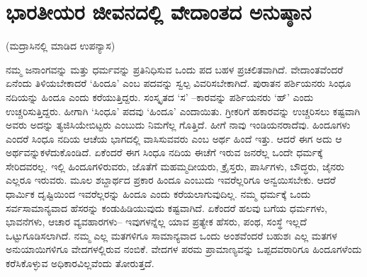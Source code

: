 
\chapter{ಭಾರತೀಯರ ಜೀವನದಲ್ಲಿ ವೇದಾಂತದ ಅನುಷ್ಠಾನ}

\begin{center}
(ಮದ್ರಾಸಿನಲ್ಲಿ ಮಾಡಿದ ಉಪನ್ಯಾಸ)
\end{center}

ನಮ್ಮ ಜನಾಂಗವನ್ನು ಮತ್ತು ಧರ್ಮವನ್ನು ಪ್ರತಿನಿಧಿಸುವ ಒಂದು ಪದ ಬಹಳ ಪ್ರಚಲಿತವಾಗಿದೆ. ವೇದಾಂತವೆಂದರೆ ಏನೆಂದು ತಿಳಿಯಬೇಕಾದರೆ ‘ಹಿಂದೂ’ ಎಂಬ ಪದವನ್ನು ಸ್ವಲ್ಪ ವಿವರಿಸಬೇಕಾಗಿದೆ. ಪುರಾತನ ಪರ್ಶಿಯನರು ಸಿಂಧೂ ನದಿಯನ್ನು ಹಿಂದೂ ಎಂದು ಕರೆಯುತ್ತಿದ್ದರು. ಸಂಸ್ಕೃತದ ‘ಸ’ –ಕಾರವನ್ನು ಪರ್ಶಿಯನರು ‘ಹ್​’ ಎಂದು ಉಚ್ಚರಿಸುತ್ತಿದ್ದರು. ಹೀಗಾಗಿ ‘ಸಿಂಧೂ’ ಪದವು ‘ಹಿಂದೂ’ ಎಂದಾಯಿತು. ಗ್ರೀಕರಿಗೆ ಹಕಾರವನ್ನು ಉಚ್ಚರಿಸಲು ಕಷ್ಟವಾಗಿ ಅವರು ಅದನ್ನು ತ್ಯಜಿಸಿಯೇಬಿಟ್ಟರು ಎಂಬುದು ನಿಮಗೆಲ್ಲ ಗೊತ್ತಿದೆ. ಹೀಗೆ ನಾವು ಇಂಡಿಯನರಾದೆವು. ಹಿಂದೂಗಳು ಎಂದರೆ ಸಿಂಧೂ ನದಿಯ ಆಚೆಯ ಭಾಗದಲ್ಲಿ ವಾಸಿಸುವವರು ಎಂಬ ಅರ್ಥ ಹಿಂದೆ ಇತ್ತು. ಆದರೆ ಈಗ ಅದು ಆ ಅರ್ಥವನ್ನುಕಳೆದುಕೊಂಡಿದೆ. ಏಕೆಂದರೆ ಈಗ ಸಿಂಧೂ ನದಿಯ ಈಚೆಗೆ ಇರುವ ಜನರೆಲ್ಲ ಒಂದೇ ಧರ್ಮಕ್ಕೆ ಸೇರಿದವರಲ್ಲ. ಇಲ್ಲಿ ಹಿಂದೂಗಳಿರುವರು, ಜೊತೆಗೆ ಮಹಮ್ಮದೀಯರು, ಕ್ರೈಸ್ತರು, ಪಾರ್ಸಿಗಳು, ಬೌದ್ಧರು, ಜೈನರು ಎಲ್ಲರೂ ಇರುವರು. ಮೂಲ ಶಬ್ದಾರ್ಥದ ಪ್ರಕಾರ ಹಿಂದೂ ಎಂಬುದು ಇವರೆಲ್ಲರಿಗೂ ಅನ್ವಯಿಸಬೇಕು. ಆದರೆ ಧಾರ್ಮಿಕ ದೃಷ್ಟಿಯಿಂದ ಇವರೆಲ್ಲರನ್ನು ಹಿಂದೂ ಎಂದು ಕರೆಯಲಾಗುವುದಿಲ್ಲ. ನಮ್ಮ ಧರ್ಮಕ್ಕೆ ಒಂದು ಸರ್ವಸಾಮಾನ್ಯವಾದ ಹೆಸರನ್ನು ಕಂಡುಹಿಡಿಯುವುದು ಕಷ್ಟವಾಗಿದೆ. ಏಕೆಂದರೆ ಹಲವು ಬಗೆಯ ಧರ್ಮಗಳು, ಭಾವನೆಗಳು, ಆಚಾರ ವ್ಯವಹಾರಗಳು– ಇವುಗಳನ್ನೆಲ್ಲ ಯಾವ ಪ್ರತ್ಯೇಕ ಹೆಸರು, ಪಂಥ, ಸಂಸ್ಥೆ ಇಲ್ಲದೆ ಒಟ್ಟುಗೂಡಿಸಲಾಗಿದೆ. ನಮ್ಮ ಎಲ್ಲ ಮತಗಳಿಗೂ ಸಾಮಾನ್ಯವಾದ ಒಂದು ಅಂಶವೆಂದರೆ ಬಹುಶಃ ಎಲ್ಲ ಮತಗಳ ಅನುಯಾಯಿಗಳಿಗೂ ವೇದಗಳಲ್ಲಿರುವ ನಂಬಿಕೆ. ವೇದಗಳ ಪರಮ ಪ್ರಾಮಾಣ್ಯವನ್ನು ಒಪ್ಪದವರಾರಿಗೂ ಹಿಂದೂಗಳೆಂದು ಕರೆಸಿಕೊಳ್ಳುವ ಅಧಿಕಾರವಿಲ್ಲವೆಂದು ತೋರುತ್ತದೆ.

